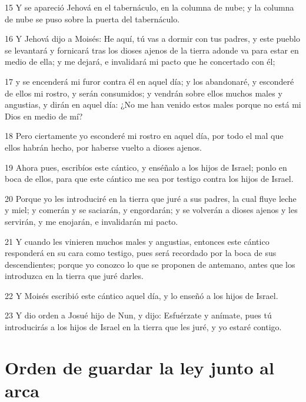 \par 15 Y se apareció Jehová en el tabernáculo, en la columna de nube; y la columna de nube se puso sobre la puerta del tabernáculo.
\par 16 Y Jehová dijo a Moisés: He aquí, tú vas a dormir con tus padres, y este pueblo se levantará y fornicará tras los dioses ajenos de la tierra adonde va para estar en medio de ella; y me dejará, e invalidará mi pacto que he concertado con él;
\par 17 y se encenderá mi furor contra él en aquel día; y los abandonaré, y esconderé de ellos mi rostro, y serán consumidos; y vendrán sobre ellos muchos males y angustias, y dirán en aquel día: ¿No me han venido estos males porque no está mi Dios en medio de mí?
\par 18 Pero ciertamente yo esconderé mi rostro en aquel día, por todo el mal que ellos habrán hecho, por haberse vuelto a dioses ajenos.
\par 19 Ahora pues, escribíos este cántico, y enséñalo a los hijos de Israel; ponlo en boca de ellos, para que este cántico me sea por testigo contra los hijos de Israel.
\par 20 Porque yo les introduciré en la tierra que juré a sus padres, la cual fluye leche y miel; y comerán y se saciarán, y engordarán; y se volverán a dioses ajenos y les servirán, y me enojarán, e invalidarán mi pacto.
\par 21 Y cuando les vinieren muchos males y angustias, entonces este cántico responderá en su cara como testigo, pues será recordado por la boca de sus descendientes; porque yo conozco lo que se proponen de antemano, antes que los introduzca en la tierra que juré darles.
\par 22 Y Moisés escribió este cántico aquel día, y lo enseñó a los hijos de Israel.
\par 23 Y dio orden a Josué hijo de Nun, y dijo: Esfuérzate y anímate, pues tú introducirás a los hijos de Israel en la tierra que les juré, y yo estaré contigo.

\section{Orden de guardar la ley junto al arca}

